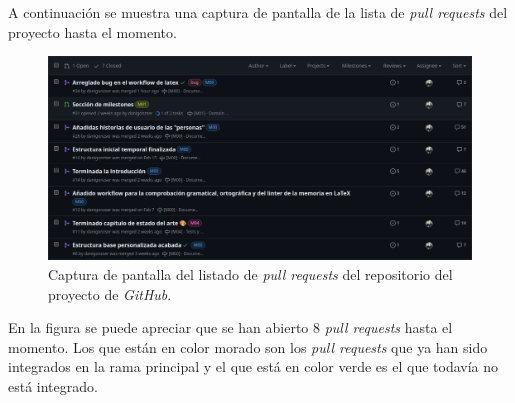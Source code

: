 A continuación se muestra una captura de pantalla de la lista de \textit{pull requests} del proyecto hasta el momento.

\begin{figure}[H]
    \caption{Captura de pantalla del listado de \textit{pull requests} del repositorio del proyecto de \textit{GitHub}.}
    \centering
    \vspace*{0.5cm}
    \includegraphics[scale=0.2]{figuras/listado_pull_requests_github.png}
\end{figure}

En la figura se puede apreciar que se han abierto 8 \textit{pull requests} hasta el momento. Los que están en color morado son los \textit{pull requests} que ya han sido integrados en la rama principal y el que está en color verde es el que todavía no está integrado.

